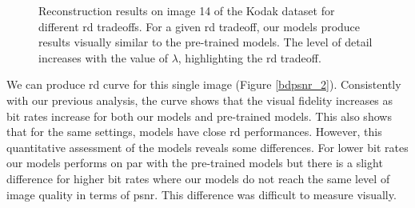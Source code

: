 \begin{figure}[H]
    \centering
    \caption[Reconstruction results on image 14 of the Kodak dataset for different \acrlong{rd} tradeoffs.]{Reconstruction results on image 14 of the Kodak dataset for different \acrlong{rd} tradeoffs. For a given \acrshort{rd} tradeoff, our models produce results visually similar to the pre-trained models. The level of detail increases with the value of \(\lambda\), highlighting the \acrshort{rd} tradeoff.}
    \label{bdpsnr_1}
\end{figure}

We can produce \acrshort{rd} curve for this single image (Figure \ref{bdpsnr_2}). Consistently with our previous analysis, the curve shows that the visual fidelity increases as bit rates increase for both our models and pre-trained models. This also shows that for the same settings, models have close \acrshort{rd} performances. However, this quantitative assessment of the models reveals some differences. For lower bit rates our models performs on par with the pre-trained models but there is a slight difference for higher bit rates where our models do not reach the same level of image quality in terms of \acrshort{psnr}. This difference was difficult to measure visually.

